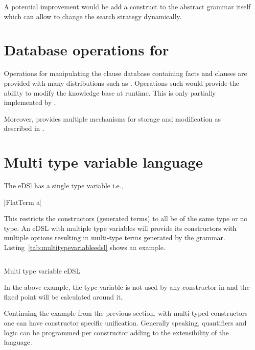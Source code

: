 \documentclass[thesis-solanki.tex]{subfiles}
\begin{document}
A potential improvement would be add a construct to the abstract grammar itself which can allow to change the
search strategy dynamically.

\section{Database operations for }
Operations for manipulating the clause database containing facts and clauses are provided with many
 distributions such as  \cite{website:swiprologdbops}.
Operations such  \cite{website:assertzswiprolog} would provide the ability to modify the
knowledge base at runtime.
This is only partially implemented by  \cite{prolog-lib}.

Moreover,  provides multiple mechanisms for storage and modification as described in
\cite{website:swiprologdbops}.

\section{Multi type variable language}
The eDSl  has a single type variable i.e.,

|FlatTerm a|

This restricts the constructors (generated terms) to all be of the same type or no type.
An eDSL with multiple type variables will provide its constructors with multiple options resulting in multi-type
terms generated by the grammar.
Listing~\ref{tab:multitypevariableedsl} shows an example.

\begin{code-list}[H]
\begin{singlespace}
\inputminted{haskell}{haskell-proto4-multi-type-variable-edsl.hs}
\end{singlespace}
\caption{Multi type variable eDSL}
\label{tab:multitypevariableedsl}
\end{code-list}

In the above example, the  type variable is not used by any constructor in
 and the fixed point will be calculated around it.

Continuing the example from the previous section, with multi typed constructors one can have constructor specific
unification.
Generally speaking, quantifiers and logic can be programmed per constructor adding to the extensibility of the
language.
\end{document}
